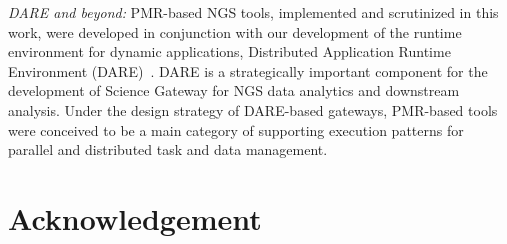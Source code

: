 \documentclass{acm_proc_article-sp}
\begin{document}
%


\textit{DARE and beyond: }PMR-based NGS tools, implemented and
scrutinized in this work, were developed in conjunction with our
development of the runtime environment for dynamic applications,
Distributed Application Runtime Environment
(DARE)~\cite{dare-tg11,dare-ecmls11}.  DARE is a strategically
important component for the development of Science Gateway for NGS
data analytics and downstream analysis.  Under the design strategy of
DARE-based gateways, PMR-based tools were conceived to be a main
category of supporting execution patterns for parallel and distributed
task and data management.


\section*{Acknowledgement}
\end{document}
